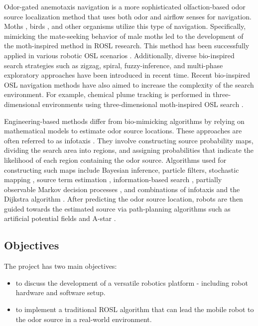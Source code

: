 Odor-gated anemotaxis navigation is a more sophisticated olfaction-based odor source localization method that uses both odor and airflow senses for navigation. Moths \cite{murlis1992odor, vickers2000mechanisms, carde2008navigational}, birds \cite{nevitt2000olfactory, wallraff2004avian}, and other organisms utilize this type of navigation. Specifically, mimicking the mate-seeking behavior of male moths led to the development of the moth-inspired method in ROSL research. This method has been successfully applied in various robotic OSL scenarios \cite{shigaki2017time}. Additionally, diverse bio-inspired search strategies such as zigzag, spiral, fuzzy-inference, and multi-phase exploratory approaches have been introduced in recent time\cite{shigaki2019modeling}. Recent bio-inspired OSL navigation methods have also aimed to increase the complexity of the search environment. For example, chemical plume tracking is performed in three-dimensional environments using three-dimensional moth-inspired OSL search \cite{rahbar20173, shigaki2022palm}.

Engineering-based methods differ from bio-mimicking algorithms by relying on mathematical models to estimate odor source locations. These approaches are often referred to as infotaxis \cite{vergassola2007infotaxis}. They involve constructing source probability maps, dividing the search area into regions, and assigning probabilities that indicate the likelihood of each region containing the odor source. Algorithms used for constructing such maps include Bayesian inference, particle filters, stochastic mapping \cite{jakuba2007stochastic}, source term estimation \cite{rahbar2019algorithm}, information-based search \cite{hutchinson2018information}, partially observable Markov decision processes \cite{hai2019underwater}, and combinations of infotaxis and the Dijkstra algorithm \cite{luong2023odor}. After predicting the odor source location, robots are then guided towards the estimated source via path-planning algorithms such as artificial potential fields and A-star \cite{pang2009reactive, wang2019chemical}.

\subsection{Objectives}\label{Subsec:mothObjectives}
The project has two main objectives:
\begin{itemize}
    \item to discuss the development of a versatile robotics platform - including robot hardware and software setup.
    \item to implement a traditional ROSL algorithm that can lead the mobile robot to the odor source in a real-world environment.
\end{itemize}


